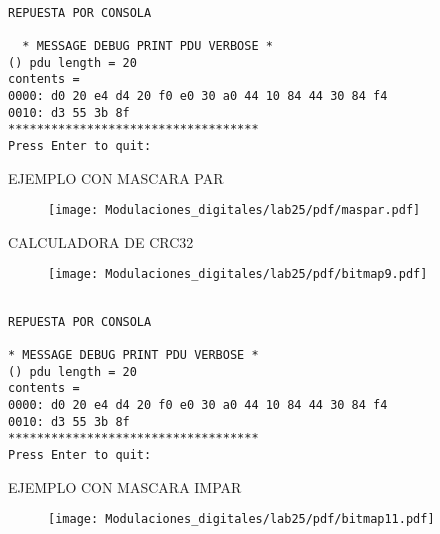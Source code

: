 \begin{verbatim}

REPUESTA POR CONSOLA 

  * MESSAGE DEBUG PRINT PDU VERBOSE *
() pdu length = 20
contents =
0000: d0 20 e4 d4 20 f0 e0 30 a0 44 10 84 44 30 84 f4
0010: d3 55 3b 8f
***********************************
Press Enter to quit:

\end{verbatim}



\begin{frame}{EJEMPLO CON MASCARA PAR}

\begin{figure}[H]
\centering
\vspace{-3mm}
\texttt{[image: Modulaciones\_digitales/lab25/pdf/maspar.pdf]}
\end{figure}

\end{frame}

\begin{frame}{CALCULADORA DE CRC32}

\begin{figure}[H]
\centering
\vspace{-3mm}
\texttt{[image: Modulaciones\_digitales/lab25/pdf/bitmap9.pdf]}
\end{figure}

\end{frame}


\begin{verbatim}
 
REPUESTA POR CONSOLA 

* MESSAGE DEBUG PRINT PDU VERBOSE *
() pdu length = 20
contents =
0000: d0 20 e4 d4 20 f0 e0 30 a0 44 10 84 44 30 84 f4
0010: d3 55 3b 8f
***********************************
Press Enter to quit:

\end{verbatim}


\begin{frame}{EJEMPLO CON MASCARA IMPAR}

\begin{figure}[H]
\centering
\vspace{-3mm}
\texttt{[image: Modulaciones\_digitales/lab25/pdf/bitmap11.pdf]}
\end{figure}

\end{frame}



